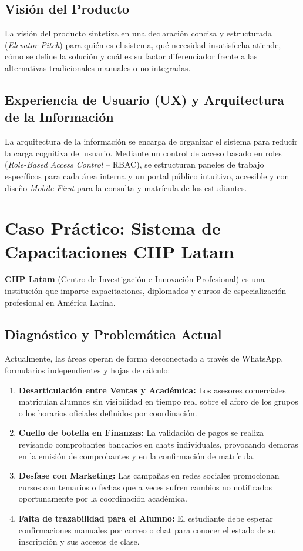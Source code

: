 \documentclass[11pt,a4paper]{article}
\begin{document}
\subsection{Visión del Producto}
La visión del producto sintetiza en una declaración concisa y estructurada (\textit{Elevator Pitch}) para quién es el sistema, qué necesidad insatisfecha atiende, cómo se define la solución y cuál es su factor diferenciador frente a las alternativas tradicionales manuales o no integradas.

\subsection{Experiencia de Usuario (UX) y Arquitectura de la Información}
La arquitectura de la información se encarga de organizar el sistema para reducir la carga cognitiva del usuario. Mediante un control de acceso basado en roles (\textit{Role-Based Access Control} -- RBAC), se estructuran paneles de trabajo específicos para cada área interna y un portal público intuitivo, accesible y con diseño \textit{Mobile-First} para la consulta y matrícula de los estudiantes.

\section{Caso Práctico: Sistema de Capacitaciones CIIP Latam}
\textbf{CIIP Latam} (Centro de Investigación e Innovación Profesional) es una institución que imparte capacitaciones, diplomados y cursos de especialización profesional en América Latina.

\subsection{Diagnóstico y Problemática Actual}
Actualmente, las áreas operan de forma desconectada a través de WhatsApp, formularios independientes y hojas de cálculo:
\begin{enumerate}
    \item \textbf{Desarticulación entre Ventas y Académica:} Los asesores comerciales matriculan alumnos sin visibilidad en tiempo real sobre el aforo de los grupos o los horarios oficiales definidos por coordinación.
    \item \textbf{Cuello de botella en Finanzas:} La validación de pagos se realiza revisando comprobantes bancarios en chats individuales, provocando demoras en la emisión de comprobantes y en la confirmación de matrícula.
    \item \textbf{Desfase con Marketing:} Las campañas en redes sociales promocionan cursos con temarios o fechas que a veces sufren cambios no notificados oportunamente por la coordinación académica.
    \item \textbf{Falta de trazabilidad para el Alumno:} El estudiante debe esperar confirmaciones manuales por correo o chat para conocer el estado de su inscripción y sus accesos de clase.
\end{enumerate}
\end{document}
